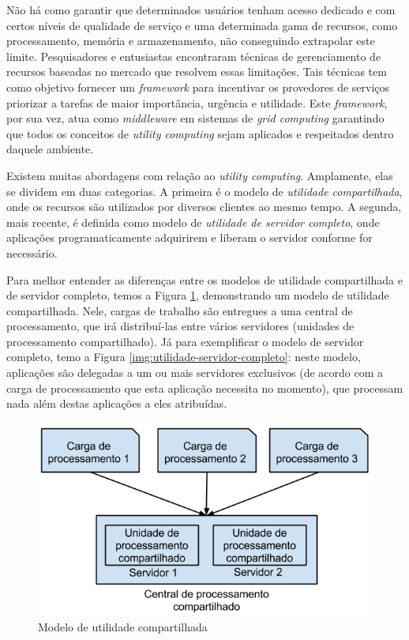 Não há como garantir que determinados usuários tenham acesso dedicado e com certos
níveis de qualidade de serviço e uma determinada gama de recursos, como processamento, memória e
armazenamento, não conseguindo extrapolar este limite. Pesquisadores e entusiastas encontraram
técnicas de gerenciamento de recursos baseadas no mercado que resolvem essas limitações. Tais
técnicas tem como objetivo fornecer um \emph{framework} para incentivar
os provedores de serviços priorizar a tarefas de maior importância, urgência e utilidade.
Este \emph{framework}, por sua vez, atua como \textit{middleware} em sistemas de \emph{grid computing}
garantindo que todos os conceitos de \emph{utility computing} sejam aplicados e respeitados
dentro daquele ambiente.

\begin{citacao}
    Existem muitas abordagens com relação ao \emph{utility computing}. Amplamente, elas se dividem
    em duas categorias. A primeira é o modelo de \textit{utilidade compartilhada}, onde
    os recursos são utilizados por diversos clientes ao mesmo tempo. A segunda, mais recente,
    é definida como modelo de \textit{utilidade de servidor completo}, onde aplicações
    programaticamente adquirirem e liberam o servidor conforme for necessário.
    \cite{utility-computing-models}
\end{citacao}

Para melhor entender as diferenças entre os modelos de utilidade compartilhada e
de servidor completo, temos a Figura \ref{img:utilidade-compartilhada}, demonstrando
um modelo de utilidade compartilhada. Nele, cargas de trabalho são entregues
a uma central de processamento, que irá distribuí-las entre vários servidores
(unidades de processamento compartilhado). Já para exemplificar o modelo de servidor
completo, temo a Figura \ref{img:utilidade-servidor-completo}: neste modelo,
aplicações são delegadas a um ou mais servidores exclusivos (de acordo com a
carga de processamento que esta aplicação necessita no momento), que processam nada
além destas aplicações a eles atribuídas.

\begin{figure}[h]
  \center
  \includegraphics[scale=0.7]{imagem/utilidade-compartilhada.png}
  \caption{Modelo de utilidade compartilhada}
  \label{img:utilidade-compartilhada}
\end{figure}


